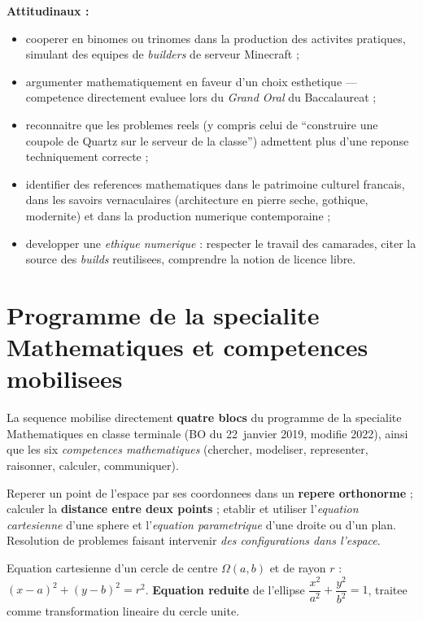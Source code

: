 \documentclass[12pt,a4paper]{scrartcl}
\newcommand{\acc}[1]{\textcolor{accent}{\textbf{#1}}}
\begin{document}
\textbf{Attitudinaux :}
\begin{itemize}[leftmargin=1.3em,itemsep=0.2em,topsep=0.3em]
  \item cooperer en binomes ou trinomes dans la production des activites pratiques, simulant des equipes de \emph{builders} de serveur Minecraft ;
  \item argumenter mathematiquement en faveur d'un choix esthetique --- competence directement evaluee lors du \emph{Grand Oral} du Baccalaureat ;
  \item reconnaitre que les problemes reels (y compris celui de \enquote{construire une coupole de Quartz sur le serveur de la classe}) admettent plus d'une reponse techniquement correcte ;
  \item identifier des references mathematiques dans le patrimoine culturel francais, dans les savoirs vernaculaires (architecture en pierre seche, gothique, modernite) et dans la production numerique contemporaine ;
  \item developper une \emph{ethique numerique} : respecter le travail des camarades, citer la source des \emph{builds} reutilisees, comprendre la notion de licence libre.
\end{itemize}


\section{Programme de la specialite Mathematiques et competences mobilisees}\label{sec:bncc}

La sequence mobilise directement \acc{quatre blocs} du programme de la specialite Mathematiques en classe terminale (BO du 22~janvier 2019, modifie 2022), ainsi que les six \emph{competences mathematiques} (chercher, modeliser, representer, raisonner, calculer, communiquer).

\begin{competence}
Reperer un point de l'espace par ses coordonnees dans un \acc{repere orthonorme} ; calculer la \acc{distance entre deux points} ; etablir et utiliser l'\emph{equation cartesienne} d'une sphere et l'\emph{equation parametrique} d'une droite ou d'un plan. Resolution de problemes faisant intervenir \emph{des configurations dans l'espace}.
\end{competence}

\begin{competence}
Equation cartesienne d'un cercle de centre $\Omega(a, b)$ et de rayon $r$ : $(x - a)^2 + (y - b)^2 = r^2$. \acc{Equation reduite} de l'ellipse $\dfrac{x^2}{a^2} + \dfrac{y^2}{b^2} = 1$, traitee comme transformation lineaire du cercle unite.
\end{competence}
\end{document}
